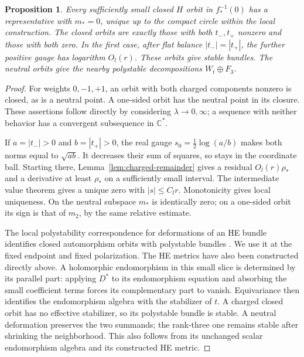 \documentclass[11pt]{amsart}
\newtheorem{proposition}[theorem]{Proposition}
\theoremstyle{definition}
\theoremstyle{remark}
\newcommand{\CC}{\mathbb C}
\begin{document}
\begin{proposition}\label{prop:endpoint-balance}
Every sufficiently small closed $H$ orbit in $f_*^{-1}(0)$ has a
representative with $m_*=0$, unique up to the compact circle within
the local construction. The closed orbits are exactly those with both
$t_-,t_+$ nonzero and those with both zero. In the first case, after
flat balance $|t_-|=|t_+|$, the further positive gauge has logarithm
$O_l(r)$. These orbits give stable bundles. The neutral orbits give
the nearby polystable decompositions $W_t\oplus F_3$.
\end{proposition}
\begin{proof}
For weights $0,-1,+1$, an orbit with both charged components nonzero
is closed, as is a neutral point. A one-sided orbit has the neutral
point in its closure. These assertions follow directly by considering
$\lambda\to0,\infty$; a sequence with neither behavior has a
convergent subsequence in $\CC^*$.

If $a=|t_-|>0$ and $b=|t_+|>0$, the real gauge
$s_0=\frac12\log(a/b)$ makes both norms equal to $\sqrt{ab}$.
It decreases their sum of squares, so stays in the coordinate ball.
Starting there, Lemma~\ref{lem:charged-remainder} gives a residual
$O_l(r)\rho_*$ and a derivative at least $\rho_*$ on a sufficiently
small interval. The intermediate value theorem gives a unique zero
with $|s|\le C_lr$. Monotonicity gives local uniqueness. On the
neutral subspace $m_*$ is identically zero; on a one-sided orbit its
sign is that of $m_2$, by the same relative estimate.

The local polystability correspondence for deformations of an HE bundle
identifies closed automorphism orbits with polystable bundles
\cite[Theorems~5.4 and 8.1]{BuchdahlSchumacher20}. We use it at
the fixed endpoint and fixed polarization. The HE metrics have also
been constructed directly above. A holomorphic endomorphism in this
small slice is determined by its parallel part: applying $D^*$ to its
endomorphism equation and absorbing the small coefficient terms forces
its complementary part to vanish. Equivariance then identifies the
endomorphism algebra with the stabilizer of $t$. A charged closed orbit
has no effective stabilizer, so its polystable bundle is stable.
A neutral deformation preserves the two summands; the rank-three one
remains stable after shrinking the neighborhood. This also follows from
its unchanged scalar endomorphism algebra and its constructed HE metric.
\end{proof}
\end{document}
